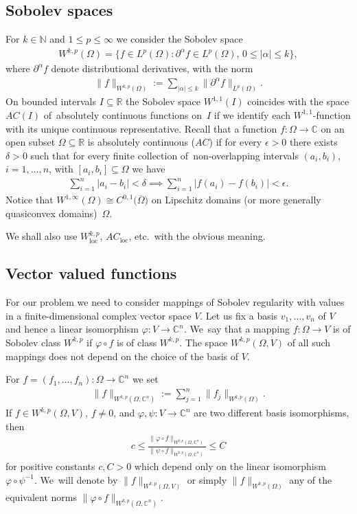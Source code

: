 \documentclass[pdftex]{sigma}
\numberwithin{equation}{section}
\def\al{\alpha}
\def\de{\delta}
\def\ep{\epsilon}
\def\vh{\varphi}
\def\ps{\psi}
\def\Om{\Omega}
\def\C{\mathbb{C}}
\def\N{\mathbb{N}}
\def\R{\mathbb{R}}
\def\p{\partial}
\def\ol{\overline}
\renewcommand{\o}{\circ}
\let\on=\operatorname
\begin{document}
\subsection{Sobolev spaces}
For $k \in \N$ and $1 \le p \le \infty$ we consider the Sobolev space
\begin{gather*}
 W^{k,p}(\Om) = \big\{f \in L^p(\Om) \colon \p^\al f \in L^p(\Om), \, 0 \le |\al| \le k\big\},
\end{gather*}
where $\p^\al f$ denote distributional derivatives, with the norm
\begin{gather*}
 \|f\|_{W^{k,p}(\Om)} := \sum_{|\al| \le k} \|\p^\al f\|_{L^p(\Om)}.
\end{gather*}
On bounded intervals $I \subseteq \R$ the Sobolev space $W^{1,1}(I)$
coincides with the space $AC(I)$ of~abso\-lutely continuous functions on~$I$
if we identify each $W^{1,1}$-function with its unique continuous representative.
Recall that a function $f \colon \Om \to \C$ on an open subset $\Om \subseteq \R$
is absolutely continuous ($AC$) if for every $\ep>0$ there exists $\de>0$ such that
for every finite collection of~non-overlapping intervals $(a_i,b_i)$, $i =1,\dots,n$, with
$[a_i,b_i] \subseteq \Om$ we have
\begin{gather*}
 \sum_{i=1}^n |a_i -b_i| < \de \implies \sum_{i=1}^n |f(a_i) -f(b_i)| < \ep.
\end{gather*}
Notice that $W^{1,\infty}(\Om) \cong C^{0,1}\big(\ol \Om\big)$ on Lipschitz domains (or more generally quasiconvex domains)~$\Om$.

We shall also use $W^{k,p}_{\on{loc}}$, $AC_{\on{loc}}$, etc.\ with the obvious meaning.

\subsection{Vector valued functions}

For our problem we need to consider mappings of Sobolev regularity with values in a finite-dimensional complex vector space $V$.
Let us fix a basis $v_1, \dots, v_n$ of $V$ and hence a linear isomorphism $\vh \colon V \to \C^n$. We~say that a mapping $f \colon \Om \to V$ is of Sobolev class $W^{k,p}$ if $\vh \o f$ is of class $W^{k,p}$.
The space $W^{k,p}(\Om, V)$ of all such mappings does not depend on the choice of the basis of $V$.

For $f= (f_1,\dots,f_n) \colon \Om \to \C^n$ we set
\begin{gather} \label{vectorvalued}
 \|f\|_{W^{k,p}(\Om,\C^n)} := \sum_{j=1}^n \|f_j\|_{W^{k,p}(\Om)}.
\end{gather}
If $f \in W^{k,p}(\Om, V)$, $f \ne 0$, and $\vh,\ps \colon V \to \C^n$ are two different basis isomorphisms, then
\begin{gather*}
 c \le \frac{\|\vh \o f\|_{W^{k,p}(\Om,\C^n)}}{\|\ps \o f\|_{W^{k,p}(\Om,\C^n)}} \le C
\end{gather*}
for positive constants $c,C>0$ which depend only on the linear isomorphism $\vh \o \ps^{-1}$. We~will denote by ${\|f\|_{W^{k,p}(\Om,V)}}$ or simply ${\|f\|_{W^{k,p}(\Om)}}$ any of the equivalent norms
$\|\vh \o f\|_{W^{k,p}(\Om,\C^n)}$.
\end{document}
